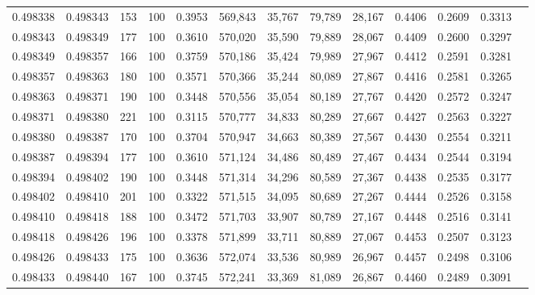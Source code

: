 \begin{tabular}{rrrrrrrrrrrrr}
0.498338 & 0.498343 &   153 & 100 &                                     0.3953 & 569,843 &  35,767 &  79,789 &  28,167 & 0.4406 & 0.2609 & 0.3313 \\
0.498343 & 0.498349 &   177 & 100 &                                     0.3610 & 570,020 &  35,590 &  79,889 &  28,067 & 0.4409 & 0.2600 & 0.3297 \\
0.498349 & 0.498357 &   166 & 100 &                                     0.3759 & 570,186 &  35,424 &  79,989 &  27,967 & 0.4412 & 0.2591 & 0.3281 \\
0.498357 & 0.498363 &   180 & 100 &                                     0.3571 & 570,366 &  35,244 &  80,089 &  27,867 & 0.4416 & 0.2581 & 0.3265 \\
0.498363 & 0.498371 &   190 & 100 &                                     0.3448 & 570,556 &  35,054 &  80,189 &  27,767 & 0.4420 & 0.2572 & 0.3247 \\
0.498371 & 0.498380 &   221 & 100 &                                     0.3115 & 570,777 &  34,833 &  80,289 &  27,667 & 0.4427 & 0.2563 & 0.3227 \\
0.498380 & 0.498387 &   170 & 100 &                                     0.3704 & 570,947 &  34,663 &  80,389 &  27,567 & 0.4430 & 0.2554 & 0.3211 \\
0.498387 & 0.498394 &   177 & 100 &                                     0.3610 & 571,124 &  34,486 &  80,489 &  27,467 & 0.4434 & 0.2544 & 0.3194 \\
0.498394 & 0.498402 &   190 & 100 &                                     0.3448 & 571,314 &  34,296 &  80,589 &  27,367 & 0.4438 & 0.2535 & 0.3177 \\
0.498402 & 0.498410 &   201 & 100 &                                     0.3322 & 571,515 &  34,095 &  80,689 &  27,267 & 0.4444 & 0.2526 & 0.3158 \\
0.498410 & 0.498418 &   188 & 100 &                                     0.3472 & 571,703 &  33,907 &  80,789 &  27,167 & 0.4448 & 0.2516 & 0.3141 \\
0.498418 & 0.498426 &   196 & 100 &                                     0.3378 & 571,899 &  33,711 &  80,889 &  27,067 & 0.4453 & 0.2507 & 0.3123 \\
0.498426 & 0.498433 &   175 & 100 &                                     0.3636 & 572,074 &  33,536 &  80,989 &  26,967 & 0.4457 & 0.2498 & 0.3106 \\
0.498433 & 0.498440 &   167 & 100 &                                     0.3745 & 572,241 &  33,369 &  81,089 &  26,867 & 0.4460 & 0.2489 & 0.3091 \\

\end{tabular}
